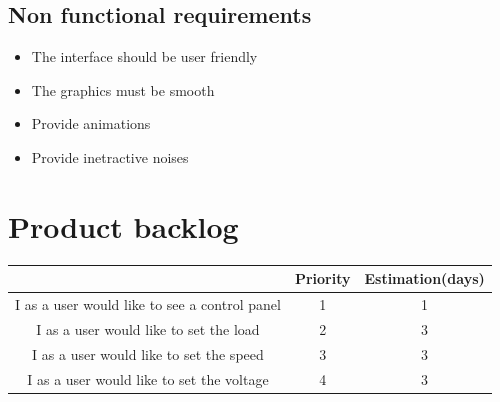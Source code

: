 \documentclass[]{report}
\begin{document}
\subsection{Non functional requirements}
\begin{itemize}
	\item The interface should be user friendly
	\item The graphics must be smooth
	\item Provide animations
	\item Provide inetractive noises
\end{itemize}
\section{Product backlog}

\begin{table}[H]
	\renewcommand{\arraystretch}{4} %
	\linespread{0.45}\selectfont\centering
	\begin{center}
	\begin{tabular}{ccc}
		\hline
		\rowcolor[HTML]{6600ff}
		\multicolumn{1}{|c|}{\color{white}\textbf{User story}}                                                                                                             & \multicolumn{1}{c|}{\color{white}\textbf{Priority}} & \multicolumn{1}{c|}{{\color{white}\textbf {Estimation(days)}}} \\ \hline
		\multicolumn{1}{|c|}{I as a user would like to see a control panel}                                                                                   & \multicolumn{1}{c|}{1}                 & \multicolumn{1}{c|}{1}                \\ \hline
		\multicolumn{1}{|c|}{I as a user would like to set the load}                                                                                          & \multicolumn{1}{c|}{2}                 & \multicolumn{1}{c|}{3}                \\ \hline
		\multicolumn{1}{|c|}{I as a user would like to set the speed}                                                                                         & \multicolumn{1}{c|}{3}                 & \multicolumn{1}{c|}{3}                \\ \hline
		\multicolumn{1}{|c|}{I as a user would like to set the voltage}                                                                                       & \multicolumn{1}{c|}{4}                 & \multicolumn{1}{c|}{3}                \\ \hline

\end{tabular}
\end{center}
\end{table}
\end{document}
